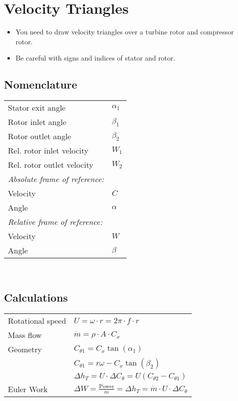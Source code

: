 




\section*{Velocity Triangles}
\begin{itemize}
	\item You need to draw velocity triangles over a turbine rotor and compressor rotor.
	\item Be careful with signs and indices of stator and rotor.
\end{itemize}

\subsection*{Nomenclature}
\begin{tabular}{ m{5cm} l}
	Stator exit angle & $\alpha_1$\\
	Rotor inlet angle & $\beta_1$ \\
	Rotor outlet angle & $\beta_2$ \\
	Rel. rotor inlet velocity & $W_1$ \\
	Rel. rotor outlet velocity & $W_2$ \\
   \textit{ Absolute frame of reference:} & \\
    Velocity & $C$ \\
    Angle & $\alpha$ \\
    \textit{Relative frame of reference:} & \\
    Velocity & $W$ \\
    Angle & $\beta$ \\
\end{tabular} \\

\subsection*{Calculations}
\begin{tabular}{ m{5cm} l}
	Rotational speed & $U = \omega \cdot r = 2 \pi \cdot f \cdot r$ \\
	Mass flow & $\dot{m} = \rho \cdot A \cdot C_x $ \\
	Geometry & $C_{\theta 1 } = C_x \tan( \alpha_1 ) $ \\
		& $C_{\theta 1} = r \omega - C_x \tan \left( \beta_2 \right) $ \\
		& $\Delta h_T = U \cdot \Delta C_\theta = U \left(C_{\theta 2} - C _{\theta 1} \right) $ \\
	Euler Work & $\Delta W = \frac{\text{Power}}{\dot{m}} = \Delta h_T = \dot{m} \cdot U \cdot \Delta C_\theta$
\end{tabular}


